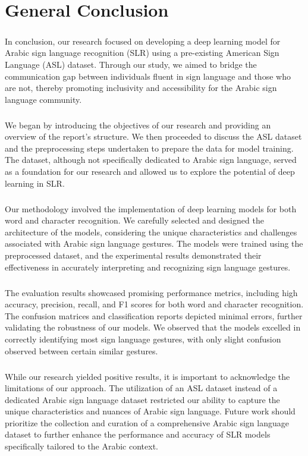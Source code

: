 \chapter*{General Conclusion}
\paragraph{}
In conclusion, our research focused on developing a deep learning model for Arabic sign language recognition (SLR) using a pre-existing American Sign Language (ASL) dataset. Through our study, we aimed to bridge the communication gap between individuals fluent in sign language and those who are not, thereby promoting inclusivity and accessibility for the Arabic sign language community.
\paragraph{}
We began by introducing the objectives of our research and providing an overview of the report's structure. We then proceeded to discuss the ASL dataset and the preprocessing steps undertaken to prepare the data for model training. The dataset, although not specifically dedicated to Arabic sign language, served as a foundation for our research and allowed us to explore the potential of deep learning in SLR.
\paragraph{}
Our methodology involved the implementation of deep learning models for both word and character recognition. We carefully selected and designed the architecture of the models, considering the unique characteristics and challenges associated with Arabic sign language gestures. The models were trained using the preprocessed dataset, and the experimental results demonstrated their effectiveness in accurately interpreting and recognizing sign language gestures.
\paragraph{}
The evaluation results showcased promising performance metrics, including high accuracy, precision, recall, and F1 scores for both word and character recognition. The confusion matrices and classification reports depicted minimal errors, further validating the robustness of our models. We observed that the models excelled in correctly identifying most sign language gestures, with only slight confusion observed between certain similar gestures.
\paragraph{}
While our research yielded positive results, it is important to acknowledge the limitations of our approach. The utilization of an ASL dataset instead of a dedicated Arabic sign language dataset restricted our ability to capture the unique characteristics and nuances of Arabic sign language. Future work should prioritize the collection and curation of a comprehensive Arabic sign language dataset to further enhance the performance and accuracy of SLR models specifically tailored to the Arabic context.
